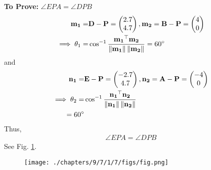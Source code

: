 \documentclass[10pt]{article}
\newcommand{\myvec}[1]{\ensuremath{\begin{pmatrix}#1\end{pmatrix}}}
\providecommand{\norm}[1]{\left\lVert#1\right\rVert}
\let\vec\mathbf{}
\begin{document}
\textbf{To Prove:}  $\angle EPA = \angle DPB$
\fi
\begin{align}
\vec{m_1}=&\vec{D}-\vec{P}=\myvec{2.7\\4.7}, \vec{m_2}=\vec{B}-\vec{P}=\myvec{4\\0}\\
\implies \theta_1=&\cos^{-1}\frac{\vec{m_1}^\top\vec{m_2}}{\norm{\vec{m_1}}\norm{\vec{m_2}}}
=60\degree
\label{eq:chapters/9/7/1/7/1}\\
\end{align}
and
\begin{align}
\vec{n_1}=&\vec{E}-\vec{P}=\myvec{-2.7\\4.7}, \vec{n_2}=\vec{A}-\vec{P}=\myvec{-4\\0}\\
\implies \theta_2 =& \cos^{-1}\frac{\vec{n_1}^\top\vec{n_2}}{\norm{\vec{n_1}}\norm{\vec{n_2}}}\\
=60\degree
\label{eq:chapters/9/7/1/7/2}
\end{align}
Thus, 
\begin{align}
\angle EPA = \angle DPB
\end{align}
See Fig. 
\ref{fig:chapters/9/7/1/7/Fig1}.
\begin{figure}[H]
	\begin{center}
		\texttt{[image: ./chapters/9/7/1/7/figs/fig.png]}
	\end{center}
\caption{}
\label{fig:chapters/9/7/1/7/Fig1}
\end{figure}
\end{document}
